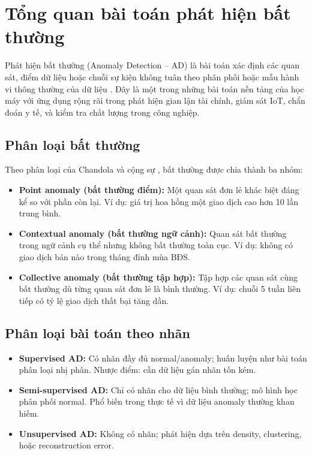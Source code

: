 
\section{Tổng quan bài toán phát hiện bất thường}

Phát hiện bất thường (Anomaly Detection -- AD) là bài toán xác định các quan sát, điểm dữ liệu hoặc chuỗi sự kiện không tuân theo phân phối hoặc mẫu hành vi thông thường của dữ liệu \cite{chandola2009anomaly}. Đây là một trong những bài toán nền tảng của học máy với ứng dụng rộng rãi trong phát hiện gian lận tài chính, giám sát IoT, chẩn đoán y tế, và kiểm tra chất lượng trong công nghiệp.

\subsection{Phân loại bất thường}

Theo phân loại của Chandola và cộng sự \cite{chandola2009anomaly}, bất thường được chia thành ba nhóm:
\begin{itemize}
  \item \textbf{Point anomaly (bất thường điểm):} Một quan sát đơn lẻ khác biệt đáng kể so với phần còn lại. Ví dụ: giá trị hoa hồng một giao dịch cao hơn 10 lần trung bình.
  \item \textbf{Contextual anomaly (bất thường ngữ cảnh):} Quan sát bất thường trong ngữ cảnh cụ thể nhưng không bất thường toàn cục. Ví dụ: không có giao dịch bán nào trong tháng đỉnh mùa BĐS.
  \item \textbf{Collective anomaly (bất thường tập hợp):} Tập hợp các quan sát cùng bất thường dù từng quan sát đơn lẻ là bình thường. Ví dụ: chuỗi 5 tuần liên tiếp có tỷ lệ giao dịch thất bại tăng dần.
\end{itemize}

\subsection{Phân loại bài toán theo nhãn}

\begin{itemize}
  \item \textbf{Supervised AD:} Có nhãn đầy đủ normal/anomaly; huấn luyện như bài toán phân loại nhị phân. Nhược điểm: cần dữ liệu gán nhãn tốn kém.
  \item \textbf{Semi-supervised AD:} Chỉ có nhãn cho dữ liệu bình thường; mô hình học phân phối normal. Phổ biến trong thực tế vì dữ liệu anomaly thường khan hiếm.
  \item \textbf{Unsupervised AD:} Không có nhãn; phát hiện dựa trên density, clustering, hoặc reconstruction error.
\end{itemize}

